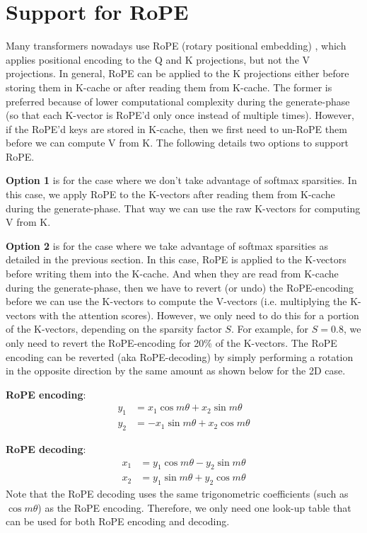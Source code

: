 \documentclass{article}
\begin{document}
\section{Support for RoPE}
Many transformers nowadays use RoPE (rotary positional embedding) \citep{RoPE}, which applies positional encoding to the Q and K projections, but not the V projections. In general, RoPE can be applied to the K projections either before storing them in K-cache or after reading them from K-cache. The former is preferred because of lower computational complexity during the generate-phase (so that each K-vector is RoPE’d only once instead of multiple times). However, if the RoPE’d keys are stored in K-cache, then we first need to un-RoPE them before we can compute V from K. The following details two options to support RoPE.

\textbf{Option 1} is for the case where we don’t take advantage of softmax sparsities. In this case, we apply RoPE to the K-vectors after reading them from K-cache during the generate-phase. That way we can use the raw K-vectors for computing V from K.

\textbf{Option 2} is for the case where we take advantage of softmax sparsities as detailed in the previous section. In this case, RoPE is applied to the K-vectors before writing them into the K-cache. And when they are read from K-cache during the generate-phase, then we have to revert (or undo) the RoPE-encoding before we can use the K-vectors to compute the V-vectors (i.e. multiplying the K-vectors with the attention scores). However, we only need to do this for a portion of the K-vectors, depending on the sparsity factor $S$. For example, for $S = 0.8$, we only need to revert the RoPE-encoding for 20\% of the K-vectors. The RoPE encoding can be reverted (aka RoPE-decoding) by simply performing a rotation in the opposite direction by the same amount as shown below for the 2D case.

\textbf{RoPE encoding}:
\begin{align*}
  y_1 &=  x_1 \cos{m \theta} + x_2 \sin{m \theta} \\
  y_2 &= -x_1 \sin{m \theta} + x_2 \cos{m \theta}
\end{align*}

\textbf{RoPE decoding}:
\begin{align*}
  x_1 &= y_1 \cos{m \theta} - y_2 \sin{m \theta} \\
  x_2 &= y_1 \sin{m \theta} + y_2 \cos{m \theta}
\end{align*}
Note that the RoPE decoding uses the same trigonometric coefficients (such as $\cos{m \theta}$) as the RoPE encoding. Therefore, we only need one look-up table that can be used for both RoPE encoding and decoding.
\end{document}
